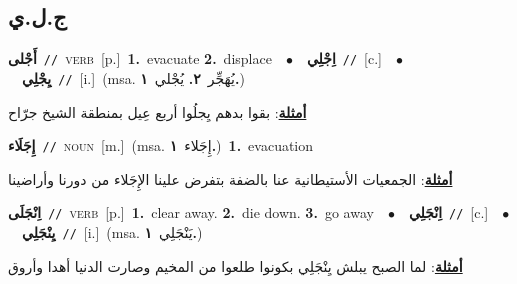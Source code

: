 \documentclass[10pt,a4paper,twoside]{article} %
\begin{document}
\begin{multicols}{2}
\vspace{-3mm}
\subsection*{\color{blue}\foreignlanguage{arabic}{ج.ل.ي}\color{blue}{}} 

{\setlength\topsep{0pt}\textbf{\foreignlanguage{arabic}{أَجْلى}}\ {\color{gray}\texttt{//}\color{black}}\ \textsc{verb}\ [p.]\ \textbf{1.}~evacuate  \textbf{2.}~displace\ \ $\bullet$\ \ \setlength\topsep{0pt}\textbf{\foreignlanguage{arabic}{اِجْلِي}}\ {\color{gray}\texttt{//}\color{black}}\ [c.]\ \ $\bullet$\ \ \setlength\topsep{0pt}\textbf{\foreignlanguage{arabic}{يِجْلِي}}\ {\color{gray}\texttt{//}\color{black}}\ [i.]\ \color{gray}(msa. \foreignlanguage{arabic}{يُهَجِّر}~\foreignlanguage{arabic}{\textbf{٢.}}  \foreignlanguage{arabic}{يُجْلي}~\foreignlanguage{arabic}{\textbf{١.}})\color{black}\  \begin{flushright}\color{gray}\foreignlanguage{arabic}{\textbf{\underline{\foreignlanguage{arabic}{أمثلة}}}: بقوا بدهم يِجلُوا أربع عِيل بمنطقة الشيخ جرّاح}\end{flushright}\color{black}} \vspace{2mm}

{\setlength\topsep{0pt}\textbf{\foreignlanguage{arabic}{إِجَلَاء}}\ {\color{gray}\texttt{//}\color{black}}\ \textsc{noun}\ [m.]\ \color{gray}(msa. \foreignlanguage{arabic}{إِجَلاء}~\foreignlanguage{arabic}{\textbf{١.}})\color{black}\ \textbf{1.}~evacuation\  \begin{flushright}\color{gray}\foreignlanguage{arabic}{\textbf{\underline{\foreignlanguage{arabic}{أمثلة}}}: الجمعيات الأستيطانية عنا بالضفة بتفرض علينا الإِجَلاء من دورنا وأراضينا}\end{flushright}\color{black}} \vspace{2mm}

{\setlength\topsep{0pt}\textbf{\foreignlanguage{arabic}{اِنْجَلَى}}\ {\color{gray}\texttt{//}\color{black}}\ \textsc{verb}\ [p.]\ \textbf{1.}~clear away.  \textbf{2.}~die down.  \textbf{3.}~go away\ \ $\bullet$\ \ \setlength\topsep{0pt}\textbf{\foreignlanguage{arabic}{اِنْجَلِي}}\ {\color{gray}\texttt{//}\color{black}}\ [c.]\ \ $\bullet$\ \ \setlength\topsep{0pt}\textbf{\foreignlanguage{arabic}{يِنْجَلِي}}\ {\color{gray}\texttt{//}\color{black}}\ [i.]\ \color{gray}(msa. \foreignlanguage{arabic}{يَنْجَلِي}~\foreignlanguage{arabic}{\textbf{١.}})\color{black}\  \begin{flushright}\color{gray}\foreignlanguage{arabic}{\textbf{\underline{\foreignlanguage{arabic}{أمثلة}}}: لما الصبح يبلش يِنْجَلِي بكونوا طلعوا من المخيم وصارت الدنيا أهدا وأروق}\end{flushright}\color{black}} \vspace{2mm}


\end{multicols}
\end{document}
